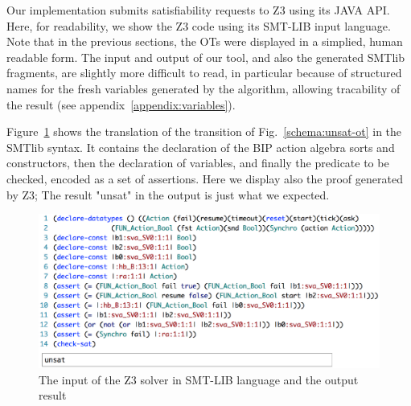 \documentclass{lncs/llncs}
\newcommand{\noteSB}[2][color=green!40, size=\tiny]{\todo[#1]{{\bf
      Note: } {#2}}}
\begin{document}
Our implementation submits satisfiability requests to
Z3 using its JAVA API. Here, for readability, we
show the Z3 code using its SMT-LIB input language.
Note that in the previous sections, the OTs were displayed in a
  simplied, human readable form. The input and output of our tool, and
  also the generated SMTlib fragments, are
  slightly more difficult to read, in 
particular because of structured names for the fresh variables generated
by the algorithm, allowing tracability of the result (see
appendix~\ref{appendix:variables}).

Figure~\ref{schema:smt-lib} shows the translation of the
transition of Fig.~\ref{schema:unsat-ot}
in the SMTlib syntax.
It contains the declaration
of the BIP action algebra sorts 
and constructors, then the declaration of variables, and finally the
predicate to be checked, encoded as a set of assertions.
Here we display also the proof generated by Z3;
The result "unsat" in the output is just what we expected.

\begin{figure}[t]
    \centerline{\includegraphics[width=\linewidth]{XFIG/SMTLIB3}}
  \caption{The input of the Z3 solver in SMT-LIB language and the output result}  \label{schema:smt-lib}
\end{figure}

\end{document}
